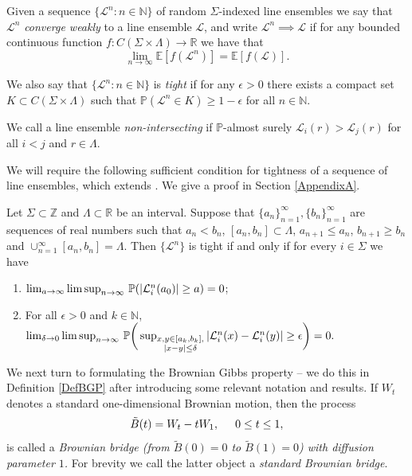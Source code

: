 \begin{definition}
Given a sequence $\{ \mathcal{L}^n: n \in \mathbb{N} \}$ of random $\Sigma$-indexed line ensembles we say that $\mathcal{L}^n$ {\em converge weakly} to a line ensemble $\mathcal{L}$, and write $\mathcal{L}^n \implies \mathcal{L}$ if for any bounded continuous function $f: C (\Sigma \times \Lambda) \rightarrow \mathbb{R}$ we have that 
$$\lim_{n \rightarrow \infty} \mathbb{E} \left[ f(\mathcal{L}^n) \right] = \mathbb{E} \left[ f(\mathcal{L}) \right].$$

We also say that $\{ \mathcal{L}^n: n \in \mathbb{N} \}$ is {\em tight} if for any $\epsilon > 0$ there exists a compact set $K \subset C (\Sigma \times \Lambda)$ such that $\mathbb{P}(\mathcal{L}^n \in K) \geq 1- \epsilon$ for all $n \in \mathbb{N}$.

We call a line ensemble {\em non-intersecting} if $\mathbb{P}$-almost surely $\mathcal{L}_i(r) > \mathcal{L}_j(r)$  for all $i < j$ and $r \in \Lambda$.
\end{definition}

We will require the following sufficient condition for tightness of a sequence of line ensembles, which extends \cite[Theorem 7.3]{Billing}. We give a proof in Section \ref{AppendixA}.

\begin{lemma}\label{2Tight}
	Let $\Sigma \subset \mathbb{Z}$ and $\Lambda\subset\mathbb{R}$ be an interval. Suppose that $\{a_n\}_{n = 1}^\infty, \{b_n\}_{n = 1}^\infty$ are sequences of real numbers such that $a_n < b_n$, $[a_n, b_n] \subset \Lambda$, $a_{n+1} \leq a_n$, $b_{n+1} \geq b_n$ and $\cup_{n = 1}^\infty [a_n, b_n] = \Lambda$. Then $\{\mathcal{L}^n\}$ is tight if and only if for every $i\in\Sigma$ we have
	\begin{enumerate}[label=(\roman*)]
		\item $\lim_{a\to\infty} \limsup_{n\to\infty}\, \mathbb{P}(|\mathcal{L}^n_i(a_0)|\geq a) = 0$;
		\item For all $\epsilon>0$ and $k \in \mathbb{N}$,  $\lim_{\delta\to 0} \limsup_{n\to\infty}\, \mathbb{P}\bigg(\sup_{\substack{x,y\in [a_k,b_k], \\ |x-y|\leq\delta}} |\mathcal{L}^n_i(x) - \mathcal{L}^n_i(y)| \geq \epsilon\bigg) = 0.$
		
	\end{enumerate}
\end{lemma}

We next turn to formulating the Brownian Gibbs property -- we do this in Definition \ref{DefBGP} after introducing some relevant notation and results. If $W_t$ denotes a standard one-dimensional Brownian motion, then the process
$$\tilde{B}(t) =  W_t - t W_1, \hspace{5mm} 0 \leq t \leq 1,$$
is called a {\em Brownian bridge (from $\tilde{B}(0) = 0$ to $\tilde{B}(1) = 0 $) with diffusion parameter $1$.} For brevity we call the latter object a {\em standard Brownian bridge}.

